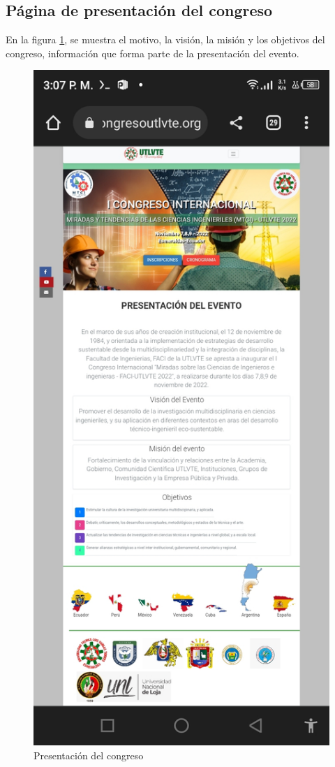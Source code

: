 \documentclass[a4paper,14px]{article}
\begin{document}
\newpage
\subsection{Página de presentación del congreso }
\label{sec:pagina-principal}

En la figura \ref{fig:presentacion}, se muestra el motivo, la visión, la misión y los  objetivos del congreso, información que forma parte de la presentación del evento.


\begin{figure}[H]
  \centering
  \includegraphics[scale=0.3]{presentacion.jpg}
  \caption{Presentación del congreso}
  \label{fig:presentacion}
\end{figure}
\end{document}
